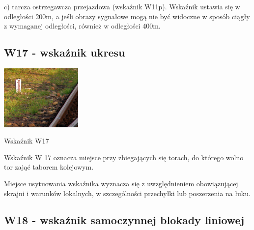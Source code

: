 c) tarcza ostrzegawcza przejazdowa (wskaźnik W11p). Wskaźnik ustawia się w odległości 200m, a jeśli obrazy sygnałowe mogą nie być widoczne w sposób ciągły z wymaganej odległości, również w odległości 400m.

\subsection{W17 - wskaźnik ukresu}
	\begin{marginfigure}
	\includegraphics[width=4cm]{skryptkierownik-img/skryptkierownik-img016.jpg}
	\caption{Wskaźnik W17}
\end{marginfigure}
\begin{tcolorbox}[colback=black!5!white,colframe=white!55!black,title=Wskaźnik W17]
Wskaźnik W 17 oznacza miejsce przy zbiegających się torach, do którego wolno tor zająć taborem kolejowym. 
\end{tcolorbox}
Miejsce usytuowania wskaźnika wyznacza się z uwzględnieniem obowiązującej skrajni i warunków lokalnych, w szczególności przechyłki lub poszerzenia na łuku.




\subsection{W18 - wskaźnik samoczynnej blokady liniowej}

